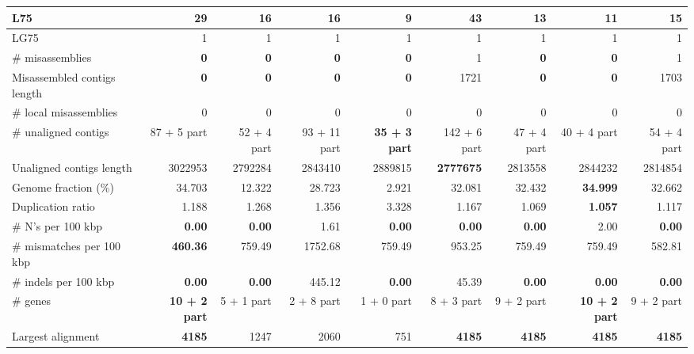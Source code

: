 \documentclass[12pt,a4paper]{article}
\begin{document}
\begin{table}[ht]
\begin{center}
\begin{tabular}{|l*{8}{|r}|}
L75 & 29 & 16 & 16 & {\bf 9} & 43 & 13 & 11 & 15 \\ \hline
LG75 & 1 & 1 & 1 & 1 & 1 & 1 & 1 & 1 \\ \hline
\# misassemblies & {\bf 0} & {\bf 0} & {\bf 0} & {\bf 0} & 1 & {\bf 0} & {\bf 0} & 1 \\ \hline
Misassembled contigs length & {\bf 0} & {\bf 0} & {\bf 0} & {\bf 0} & 1721 & {\bf 0} & {\bf 0} & 1703 \\ \hline
\# local misassemblies & 0 & 0 & 0 & 0 & 0 & 0 & 0 & 0 \\ \hline
\# unaligned contigs & 87 + 5 part & 52 + 4 part & 93 + 11 part & {\bf 35 + 3 part} & 142 + 6 part & 47 + 4 part & 40 + 4 part & 54 + 4 part \\ \hline
Unaligned contigs length & 3022953 & 2792284 & 2843410 & 2889815 & {\bf 2777675} & 2813558 & 2844232 & 2814854 \\ \hline
Genome fraction (\%) & 34.703 & 12.322 & 28.723 & 2.921 & 32.081 & 32.432 & {\bf 34.999} & 32.662 \\ \hline
Duplication ratio & 1.188 & 1.268 & 1.356 & 3.328 & 1.167 & 1.069 & {\bf 1.057} & 1.117 \\ \hline
\# N's per 100 kbp & {\bf 0.00} & {\bf 0.00} & 1.61 & {\bf 0.00} & {\bf 0.00} & {\bf 0.00} & 2.00 & {\bf 0.00} \\ \hline
\# mismatches per 100 kbp & {\bf 460.36} & 759.49 & 1752.68 & 759.49 & 953.25 & 759.49 & 759.49 & 582.81 \\ \hline
\# indels per 100 kbp & {\bf 0.00} & {\bf 0.00} & 445.12 & {\bf 0.00} & 45.39 & {\bf 0.00} & {\bf 0.00} & {\bf 0.00} \\ \hline
\# genes & {\bf 10 + 2 part} & 5 + 1 part & 2 + 8 part & 1 + 0 part & 8 + 3 part & 9 + 2 part & {\bf 10 + 2 part} & 9 + 2 part \\ \hline
Largest alignment & {\bf 4185} & 1247 & 2060 & 751 & {\bf 4185} & {\bf 4185} & {\bf 4185} & {\bf 4185} \\ \hline
\end{tabular}
\end{center}
\end{table}
\end{document}
